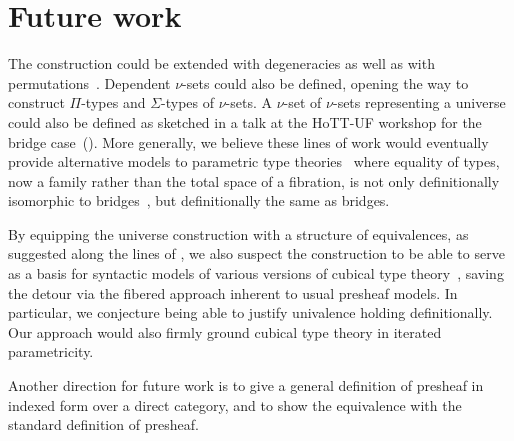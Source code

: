 \documentclass{msc}
\begin{document}
\section{Future work}
The construction could be extended with degeneracies as well as with permutations~\citep{grandis03}. Dependent $\nu$-sets could also be defined, opening the way to construct $\Pi$-types and $\Sigma$-types of $\nu$-sets. A $\nu$-set of $\nu$-sets representing a universe could also be defined as sketched in a talk at the HoTT-UF workshop for the bridge case~(\citeyear{herbelin-hott-uf}). More generally, we believe these lines of work would eventually provide alternative models to parametric type theories~\citep{nuyts17,cavallo19} where equality of types, now a family rather than the total space of a fibration, is not only definitionally isomorphic to bridges~\citep{bernardy15}, but definitionally the same as bridges.

By equipping the universe construction with a structure of equivalences, as suggested along the lines of \cite{altenkirch15}, we also suspect the construction to be able to serve as a basis for syntactic models of various versions of cubical type theory~\citep{bezem13,cohen16,angiuli21}, saving the detour via the fibered approach inherent to usual presheaf models. In particular, we conjecture being able to justify univalence holding definitionally. Our approach would also firmly ground cubical type theory in iterated parametricity.

Another direction for future work is to give a general definition of presheaf in indexed form over a direct category, and to show the equivalence with the standard definition of presheaf.

\newpage


\end{document}
